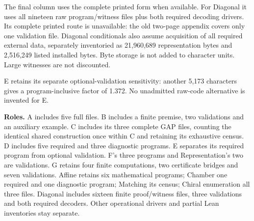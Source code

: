 \documentclass[11pt,a4paper]{article}
\begin{document}
The final column uses the complete printed form when available. For Diagonal it uses all nineteen raw program/witness files plus both required decoding drivers. Its complete printed route is unavailable: the old two-page appendix covers only one validation file. Diagonal conditionals also assume acquisition of all required external data, separately inventoried as 21,960,689 representation bytes and 2,516,249 listed installed bytes. Byte storage is not added to character units. Large witnesses are not discounted.

E retains its separate optional-validation sensitivity: another 5,173 characters gives a program-inclusive factor of 1.372. No unadmitted raw-code alternative is invented for E.

\textbf{Roles.} A includes five full files. B includes a finite premise, two validations and an auxiliary example. C includes its three complete GAP files, counting the identical shared construction once within C and retaining its exhaustive census. D includes five required and three diagnostic programs. E separates its required program from optional validation. F's three programs and Representation's two are validations. G retains four finite computations, two certificate bridges and seven validations. Affine retains six mathematical programs; Chamber one required and one diagnostic program; Matching its census; Chiral enumeration all three files. Diagonal includes sixteen finite proof/witness files, three validations and both required decoders. Other operational drivers and partial Lean inventories stay separate.
\end{document}
